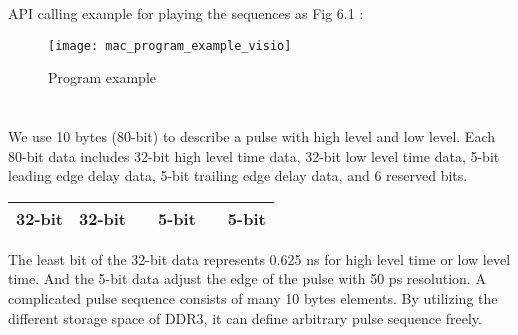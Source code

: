 \indent API calling example for playing the sequences as Fig 6.1 :

\begin{figure}[ht]
\centering
\texttt{[image: mac\_program\_example\_visio]}
\caption{\hspace{0.2cm}Program example}
\label{program_example_mac}
\end{figure}


\section{}
\indent \hspace{-0.2cm}We use 10 bytes (80-bit) to describe a pulse with high level and low level. Each 80-bit data includes 32-bit high level time data, 32-bit low level time data, 5-bit leading edge delay data, 5-bit trailing edge delay data, and 6 reserved bits.

\begin{table}[H]
\centering
\normalsize
\begin{tabular}{|m{3.5cm}|m{3.5cm}|m{0.5cm}|m{1cm}|m{0.5cm}|m{1cm}|}
\hline 32-bit & 32-bit & \qquad & 5-bit & \qquad & 5-bit \\\hline
\end{tabular}
\end{table}

\indent \hspace{-0.2cm}The least bit of the 32-bit data represents 0.625 ns for high level time or low level time. And the 5-bit data adjust the edge of the pulse with 50 ps resolution.
A complicated pulse sequence consists of many 10 bytes elements. By utilizing the different storage space of DDR3, it can define arbitrary pulse sequence freely.
